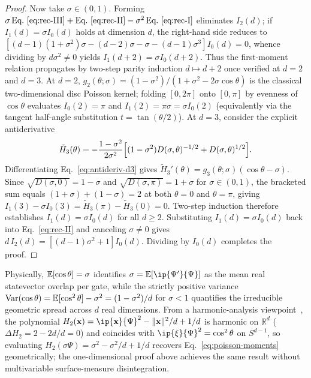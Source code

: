 \begin{proof}
Now take $\sigma \in (0, 1)$. Forming $\sigma\,\text{Eq.~\eqref{eq:rec-III}} + \text{Eq.~\eqref{eq:rec-II}} - \sigma^2\,\text{Eq.~\eqref{eq:rec-I}}$ eliminates $I_2(d)$; if $I_1(d) = \sigma I_0(d)$ holds at dimension $d$, the right-hand side reduces to $[(d - 1)(1 + \sigma^2)\sigma - (d - 2)\sigma - \sigma - (d - 1)\sigma^3]I_0(d) = 0$, whence dividing by $d\sigma^2 \ne 0$ yields $I_1(d + 2) = \sigma I_0(d + 2)$. Thus the first-moment relation propagates by two-step parity induction $d \mapsto d + 2$ once verified at $d = 2$ and $d = 3$. At $d = 2$, $g_2(\theta; \sigma) = (1 - \sigma^2)/(1 + \sigma^2 - 2\sigma\cos\theta)$ is the classical two-dimensional disc Poisson kernel; folding $[0, 2\pi]$ onto $[0, \pi]$ by evenness of $\cos\theta$ evaluates $I_0(2) = \pi$ and $I_1(2) = \pi\sigma = \sigma I_0(2)$ (equivalently via the tangent half-angle substitution $t = \tan(\theta/2)$). At $d = 3$, consider the explicit antiderivative
\begin{equation}
\tilde{H}_3(\theta) = -\frac{1 - \sigma^2}{2\sigma^2}\Bigl[(1 - \sigma^2)D(\sigma, \theta)^{-1/2} + D(\sigma, \theta)^{1/2}\Bigr].
\label{eq:antideriv-d3}
\end{equation}
Differentiating Eq.~\eqref{eq:antideriv-d3} gives $\tilde{H}_3'(\theta) = g_3(\theta; \sigma)(\cos\theta - \sigma)$. Since $\sqrt{D(\sigma, 0)} = 1 - \sigma$ and $\sqrt{D(\sigma, \pi)} = 1 + \sigma$ for $\sigma \in (0, 1)$, the bracketed sum equals $(1 + \sigma) + (1 - \sigma) = 2$ at both $\theta = 0$ and $\theta = \pi$, giving $I_1(3) - \sigma I_0(3) = \tilde{H}_3(\pi) - \tilde{H}_3(0) = 0$. Two-step induction therefore establishes $I_1(d) = \sigma I_0(d)$ for all $d \ge 2$. Substituting $I_1(d) = \sigma I_0(d)$ back into Eq.~\eqref{eq:rec-II} and canceling $\sigma \ne 0$ gives $d\,I_2(d) = [(d - 1)\sigma^2 + 1]I_0(d)$. Dividing by $I_0(d)$ completes the proof.
\end{proof}

Physically, $\mathbb{E}[\cos\theta] = \sigma$ identifies $\sigma = \E[\ip{\Psi'}{\Psi}]$ as the mean real statevector overlap per gate, while the strictly positive variance $\operatorname{Var}(\cos\theta) = \mathbb{E}[\cos^2\theta] - \sigma^2 = (1 - \sigma^2)/d$ for $\sigma < 1$ quantifies the irreducible geometric spread across $d$ real dimensions. From a harmonic-analysis viewpoint~\cite{Axler2001}, the polynomial $H_2(\mathbf{x}) = \ip{\mathbf{x}}{\Psi}^2 - \norm{\mathbf{x}}^2/d + 1/d$ is harmonic on $\mathbb{R}^d$ ($\Delta H_2 = 2 - 2d/d = 0$) and coincides with $\ip{\xi}{\Psi}^2 = \cos^2\theta$ on $S^{d-1}$, so evaluating $H_2(\sigma\Psi) = \sigma^2 - \sigma^2/d + 1/d$ recovers Eq.~\eqref{eq:poisson-moments} geometrically; the one-dimensional proof above achieves the same result without multivariable surface-measure disintegration.

